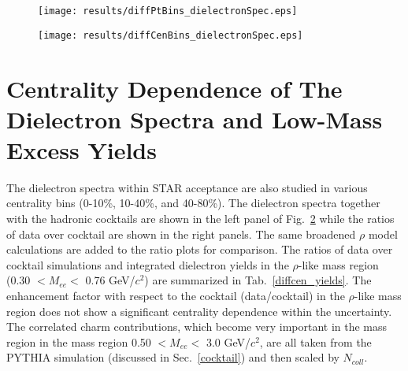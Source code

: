\begin{figure}[htbp]
\centering
\texttt{[image: results/diffPtBins\_dielectronSpec.eps]}
 \label{diffpt_spectra}
\end{figure}

\begin{figure}[htbp]
\centering
\texttt{[image: results/diffCenBins\_dielectronSpec.eps]}
 \label{diffcen_spectra}
\end{figure}

\section{Centrality Dependence of The Dielectron Spectra and Low-Mass Excess Yields}
The dielectron spectra within STAR acceptance are also studied in various centrality bins (0-10\%, 10-40\%, and 40-80\%). The dielectron spectra together with the hadronic cocktails are shown in the left panel of Fig.~\ref{diffcen_spectra} while the ratios of data over cocktail are shown in the right panels. The same broadened $\rho$ model calculations are added to the ratio plots for comparison.  The ratios of data over cocktail simulations and integrated dielectron yields in the $\rho$-like mass region (0.30 $<M_{ee}<$ 0.76 GeV/$c^{2}$) are summarized in Tab.~\ref{diffcen_yields}. The enhancement factor with respect to the cocktail (data/cocktail) in the $\rho$-like mass region does not show a significant centrality dependence within the uncertainty. The correlated charm contributions, which become very important in the mass region in the mass region 0.50 $<M_{ee}<$ 3.0 GeV/$c^{2}$, are all taken from the PYTHIA simulation (discussed in Sec.~\ref{cocktail}) and then scaled by $N_{coll}$.

